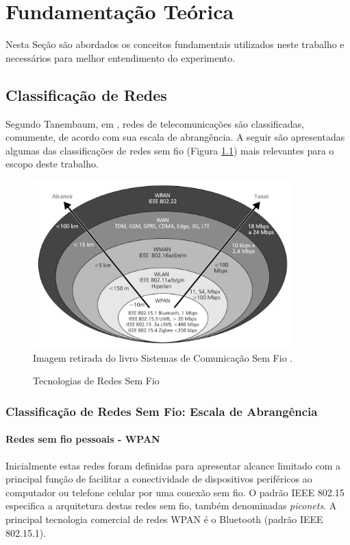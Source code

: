 \chapter{Fundamentação Teórica}
\label{fundamentacao}
Nesta Seção são abordados os conceitos fundamentais utilizados neste trabalho e necessários para melhor entendimento do experimento.

\section{Classificação de Redes}
\label{classRedes}
Segundo Tanembaum, em \cite{tanembaum2011}, redes de telecomunicações são classificadas, comumente, de acordo com sua escala de abrangência. A seguir são apresentadas algumas das classificações de redes sem fio (Figura \ref{fig:tecnologias_redes_semfiof}) mais relevantes para o escopo deste trabalho.

\begin{figure}[ht]
	\begin{center}
		\caption{Tecnologias de Redes Sem Fio}
		\includegraphics[width=10cm]{./sections/textual/chapters/images/tecnologias_redes_semfio.png}\\
		Imagem retirada do livro Sistemas de Comunicação Sem Fio \cite{rochol2018sistemas}.
		\label{fig:tecnologias_redes_semfiof}
	\end{center}
\end{figure}

\subsection{Classificação de Redes Sem Fio: Escala de Abrangência}
\subsubsection*{Redes sem fio pessoais - WPAN}
Inicialmente estas redes foram definidas para apresentar alcance limitado com a principal função de facilitar a conectividade de dispositivos periféricos ao computador ou telefone celular por uma conexão sem fio. O padrão IEEE 802.15 especifica a arquitetura destas redes sem fio, também denominadas \emph{piconets}. A principal  tecnologia comercial de redes WPAN é o Bluetooth (padrão IEEE 802.15.1).

